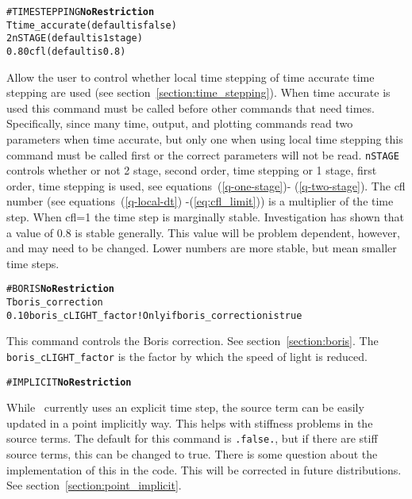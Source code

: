 \begin{alltt}
#TIMESTEPPING    \hfill {\bf No Restriction}
T                      time_accurate          (default is false)
2                      nSTAGE                 (default is 1 stage)
0.80                   cfl                    (default is 0.8)
\end{alltt}

Allow the user to control whether local time stepping of time accurate
time stepping are used (see section~\ref{section:time_stepping}).
When time accurate is used this command must
be called before other commands that need times.  Specifically, since
many time, output, and plotting commands read two parameters when time
accurate, but only one when using local time stepping this command
must be called first or the correct parameters will not be read.
{\tt nSTAGE} controls whether or not 2 stage, second order, time stepping
or 1 stage, first order, time stepping is used, see equations~(\ref{q-one-stage})-
(\ref{q-two-stage}).  The cfl number 
(see equations~(\ref{q-local-dt}) -(\ref{eq:cfl_limit}))
is
a multiplier of the time step.  When cfl=1 the time step is marginally
stable.  Investigation has shown that a value of 0.8 is stable generally.
This value will be problem dependent, however, and may need to be changed.
Lower numbers are more stable, but mean smaller time steps. 
\ \ \\

\begin{alltt}
#BORIS   \hfill    {\bf No Restriction}
T                      boris_correction
0.10                   boris_cLIGHT_factor !Only if boris_correction is true
\end{alltt}

This command controls the Boris correction.  See section~\ref{section:boris}.
The {\tt boris\_cLIGHT\_factor} is the factor by which the speed of light is
reduced.
\ \ \\


\begin{alltt}
#IMPLICIT \hfill {\bf No Restriction}
\end{alltt}

While \BATSRUS\ currently uses an explicit time step, the source term
can be easily updated in a point implicitly way.  This helps with stiffness
problems in the source terms.  The default for this command is {\tt .false.},
but if there are stiff source terms, this can be changed to true.  There
is some question about the implementation of this in the code.  This will
be corrected in future distributions. See section~\ref{section:point_implicit}.
\ \ \\


